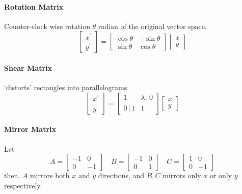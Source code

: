 \documentclass[11pt]{article}
\begin{document}
\paragraph{Rotation Matrix} Counter-clock wise rotation $\theta$ radian of the original vector space. 
\begin{equation}
	\left[\begin{array}{l}
		x^{\prime} \\
		y^{\prime}
		\end{array}\right]=\left[\begin{array}{ll}
		\cos \theta & -\sin\theta \\
		\sin\theta & \cos\theta
		\end{array}\right]\left[\begin{array}{l}
		x \\
		y
	\end{array}\right]
\end{equation}

\paragraph{Shear Matrix} `distorts' rectangles into parallelograms. 
\begin{equation}
	\left[\begin{array}{l}
		x^{\prime} \\
		y^{\prime}
		\end{array}\right]=\left[\begin{array}{ll}
		1 & \lambda\, | \,0 \\
		0\, | \,1 & 1
		\end{array}\right]\left[\begin{array}{l}
		x \\
		y
	\end{array}\right]
\end{equation}

\paragraph{Mirror Matrix} Let
\begin{equation}
	A = \begin{bmatrix}
		-1 & 0 \\ 0 & -1
	\end{bmatrix} \quad B = \begin{bmatrix}
		-1 & 0 \\ 0 & 1 
	\end{bmatrix} \quad C = \begin{bmatrix}
		1 & 0 \\
		0 & -1
	\end{bmatrix}
\end{equation}
then, $A$ mirrors both $x$ and $y$ directions, and $B, C$ mirrors only $x$ or only $y$ respectively. 
\end{document}

